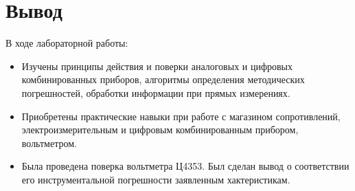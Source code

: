 \section{Вывод}
В ходе лабораторной работы:
\begin{itemize}
\item
Изучены принципы действия и поверки аналоговых и цифровых комбинированных приборов, алгоритмы определения методических погрешностей, обработки  информации при прямых измерениях.
\item
Приобретены  практические навыки при работе с магазином сопротивлений, электроизмерительным и цифровым  комбинированным прибором, вольтметром.
\item
Была проведена поверка вольтметра Ц4353. Был сделан вывод о соответствии его инструментальной погрешности заявленным хактеристикам.
\end{itemize}
\clearpage
